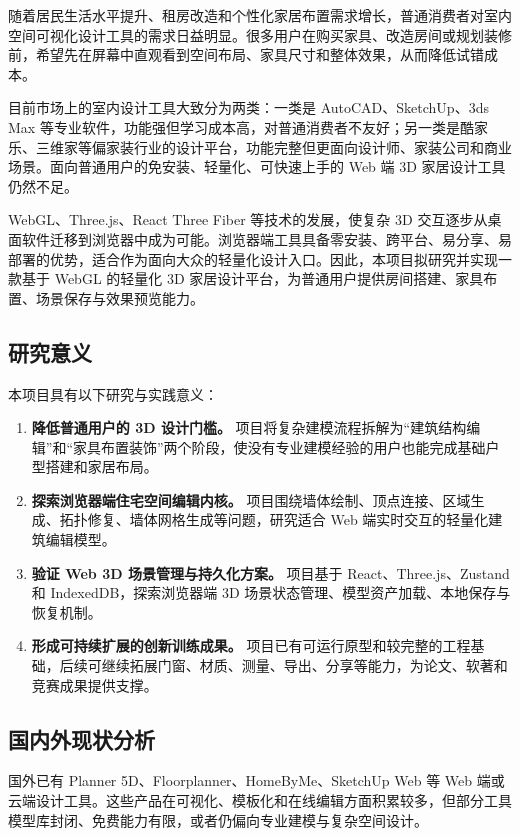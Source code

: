 \documentclass[UTF8,fontset=fandol,zihao=-4]{ctexart}
\begin{document}
随着居民生活水平提升、租房改造和个性化家居布置需求增长，普通消费者对室内空间可视化设计工具的需求日益明显。很多用户在购买家具、改造房间或规划装修前，希望先在屏幕中直观看到空间布局、家具尺寸和整体效果，从而降低试错成本。

目前市场上的室内设计工具大致分为两类：一类是 AutoCAD、SketchUp、3ds Max 等专业软件，功能强但学习成本高，对普通消费者不友好；另一类是酷家乐、三维家等偏家装行业的设计平台，功能完整但更面向设计师、家装公司和商业场景。面向普通用户的免安装、轻量化、可快速上手的 Web 端 3D 家居设计工具仍然不足。

WebGL、Three.js、React Three Fiber 等技术的发展，使复杂 3D 交互逐步从桌面软件迁移到浏览器中成为可能。浏览器端工具具备零安装、跨平台、易分享、易部署的优势，适合作为面向大众的轻量化设计入口。因此，本项目拟研究并实现一款基于 WebGL 的轻量化 3D 家居设计平台，为普通用户提供房间搭建、家具布置、场景保存与效果预览能力。

\subsection{研究意义}

本项目具有以下研究与实践意义：

\begin{enumerate}
  \item \textbf{降低普通用户的 3D 设计门槛。} 项目将复杂建模流程拆解为“建筑结构编辑”和“家具布置装饰”两个阶段，使没有专业建模经验的用户也能完成基础户型搭建和家居布局。
  \item \textbf{探索浏览器端住宅空间编辑内核。} 项目围绕墙体绘制、顶点连接、区域生成、拓扑修复、墙体网格生成等问题，研究适合 Web 端实时交互的轻量化建筑编辑模型。
  \item \textbf{验证 Web 3D 场景管理与持久化方案。} 项目基于 React、Three.js、Zustand 和 IndexedDB，探索浏览器端 3D 场景状态管理、模型资产加载、本地保存与恢复机制。
  \item \textbf{形成可持续扩展的创新训练成果。} 项目已有可运行原型和较完整的工程基础，后续可继续拓展门窗、材质、测量、导出、分享等能力，为论文、软著和竞赛成果提供支撑。
\end{enumerate}

\subsection{国内外现状分析}

国外已有 Planner 5D、Floorplanner、HomeByMe、SketchUp Web 等 Web 端或云端设计工具。这些产品在可视化、模板化和在线编辑方面积累较多，但部分工具模型库封闭、免费能力有限，或者仍偏向专业建模与复杂空间设计。
\end{document}
